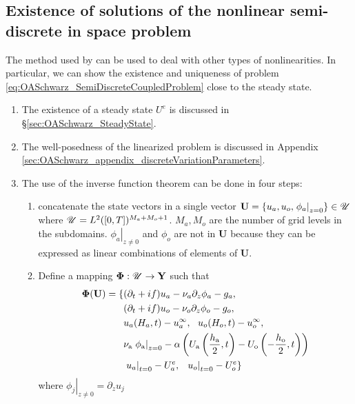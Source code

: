\subsection{Existence of solutions of the
nonlinear semi-discrete in space problem}
\label{sec:OASchwarz_wellPosedness}
The method used by \citep{chacon-rebollo_existence_2014}
can be used to deal with other types of
nonlinearities. In particular, we can show the existence and
uniqueness of problem \eqref{eq:OASchwarz_SemiDiscreteCoupledProblem}
close to the steady state.
\begin{enumerate}
	\item The existence of a steady state $U^e$ is discussed in
		\S \ref{sec:OASchwarz_SteadyState}.
	\item The well-posedness of the linearized
		problem is discussed in Appendix
	\ref{sec:OASchwarz_appendix_discreteVariationParameters}.
	\item The use of the inverse function theorem can be
		done in four steps:
	\begin{enumerate}
		\item concatenate the state vectors
			in a single vector $\mathbf{U}=
			\{u_a, u_o, \left.\phi_a\right|_{z=0}\}
			\in \mathbf{\cal U}$
		where $\mathbf{\cal U} = L^2([0,T])^{M_a+M_o+1}$.
		$M_a, M_o$ are the number of grid levels in the
		subdomains.
		$\left.\phi_a\right|_{z\neq 0}$
		and $\phi_o$ are not in $\mathbf{U}$ because they
		can be expressed as linear combinations of elements
			of $\mathbf{U}$.
		\item
	Define a mapping
	$\mathbf{\Phi}: \mathbf{\cal U}\rightarrow \mathbf{Y}$
	such that
\begin{equation}
	\label{eq:OASchwarz_wellPosedness_Phi}
\begin{aligned}
	\mathbf{\Phi}(\mathbf{U}) =
	\{&(\partial_t + if) u_a - \nu_a\partial_z \phi_a - g_a, \\
	&(\partial_t + if) u_o - \nu_o\partial_z \phi_o - g_o, \\
	&u_a(H_a, t) - u^\infty_a, ~~ u_o(H_o, t) - u^\infty_o, \\
	&\nu_{\rm a}\left.\phi_{\rm a}\right|_{z=0} - \alpha
	\left( U_{\rm a}\left(\frac{h_{\rm a}}{2},
	t\right) - U_{\rm o}\left(-\frac{h_{\rm o}}{2},
	t\right)\right) \\
	&\left.u_a\right|_{t=0} - U^e_{a}, ~~
	\left.u_o\right|_{t=0} - U^e_{o}\}
\end{aligned}
\end{equation}
where $\left.\phi_j\right|_{z\neq 0} = \partial_z u_j$

\end{enumerate}
\end{enumerate}
